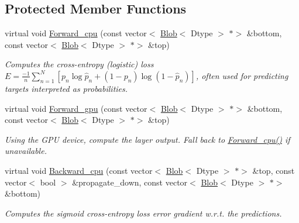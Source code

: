 \subsection*{Protected Member Functions}
\begin{DoxyCompactItemize}
\item 
virtual void \mbox{\hyperlink{classcaffe_1_1_sigmoid_cross_entropy_loss_layer_aa3e7f285742d862435d5e49d13e05064}{Forward\+\_\+cpu}} (const vector$<$ \mbox{\hyperlink{classcaffe_1_1_blob}{Blob}}$<$ Dtype $>$ $\ast$$>$ \&bottom, const vector$<$ \mbox{\hyperlink{classcaffe_1_1_blob}{Blob}}$<$ Dtype $>$ $\ast$$>$ \&top)
\begin{DoxyCompactList}\small\item\em Computes the cross-\/entropy (logistic) loss $ E = \frac{-1}{n} \sum\limits_{n=1}^N \left[ p_n \log \hat{p}_n + (1 - p_n) \log(1 - \hat{p}_n) \right] $, often used for predicting targets interpreted as probabilities. \end{DoxyCompactList}\item 
\mbox{\label{classcaffe_1_1_sigmoid_cross_entropy_loss_layer_a3a973821a2a73fd8bf4c2e474b2ad5d8}} 
virtual void \mbox{\hyperlink{classcaffe_1_1_sigmoid_cross_entropy_loss_layer_a3a973821a2a73fd8bf4c2e474b2ad5d8}{Forward\+\_\+gpu}} (const vector$<$ \mbox{\hyperlink{classcaffe_1_1_blob}{Blob}}$<$ Dtype $>$ $\ast$$>$ \&bottom, const vector$<$ \mbox{\hyperlink{classcaffe_1_1_blob}{Blob}}$<$ Dtype $>$ $\ast$$>$ \&top)
\begin{DoxyCompactList}\small\item\em Using the G\+PU device, compute the layer output. Fall back to \mbox{\hyperlink{classcaffe_1_1_sigmoid_cross_entropy_loss_layer_aa3e7f285742d862435d5e49d13e05064}{Forward\+\_\+cpu()}} if unavailable. \end{DoxyCompactList}\item 
virtual void \mbox{\hyperlink{classcaffe_1_1_sigmoid_cross_entropy_loss_layer_a025360b1de1fefbc4684e43603394a22}{Backward\+\_\+cpu}} (const vector$<$ \mbox{\hyperlink{classcaffe_1_1_blob}{Blob}}$<$ Dtype $>$ $\ast$$>$ \&top, const vector$<$ bool $>$ \&propagate\+\_\+down, const vector$<$ \mbox{\hyperlink{classcaffe_1_1_blob}{Blob}}$<$ Dtype $>$ $\ast$$>$ \&bottom)
\begin{DoxyCompactList}\small\item\em Computes the sigmoid cross-\/entropy loss error gradient w.\+r.\+t. the predictions. \end{DoxyCompactList}\item 

\end{DoxyCompactItemize}
